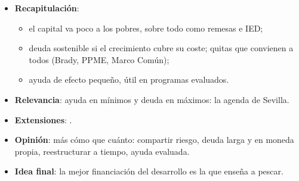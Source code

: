 \documentclass{article}
\begin{document}
\begin{columnas}
\begin{itemize}
\item \textbf{Recapitulación}:
  \begin{itemize}
  \item el capital va poco a los pobres, sobre todo como remesas e IED;
  \item deuda sostenible si el crecimiento cubre su coste; quitas que convienen a todos (Brady, PPME, Marco Común);
  \item ayuda de efecto pequeño, útil en programas evaluados.
  \end{itemize}
\item \textbf{Relevancia}: ayuda en mínimos y deuda en máximos: la agenda de Sevilla.
\item \textbf{Extensiones}:      .
\item \textbf{Opinión}: más cómo que cuánto: compartir riesgo, deuda larga y en moneda propia, reestructurar a tiempo, ayuda evaluada.
\item \textbf{Idea final}: la mejor financiación del desarrollo es la que enseña a pescar.
\end{itemize}


\end{columnas}
\end{document}

